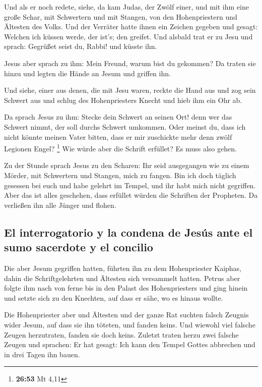  Und als er noch redete, siehe, da kam Judas, der Zwölf
einer, und mit ihm eine große Schar, mit Schwertern und mit Stangen, von
den Hohenpriestern und Ältesten des Volks.  Und der
Verräter hatte ihnen ein Zeichen gegeben und gesagt: Welchen ich küssen
werde, der ist's; den greifet.  Und alsbald trat er zu
Jesu und sprach: Gegrüßet seist du, Rabbi! und küsste ihn.

 Jesus aber sprach zu ihm: Mein Freund, warum bist du
gekommen? Da traten sie hinzu und legten die Hände an Jesum und griffen
ihn.

 Und siehe, einer aus denen, die mit Jesu waren, reckte
die Hand aus und zog sein Schwert aus und schlug des Hohenpriesters
Knecht und hieb ihm ein Ohr ab.

 Da sprach Jesus zu ihm: Stecke dein Schwert an seinen
Ort! denn wer das Schwert nimmt, der soll durchs Schwert umkommen.
 Oder meinst du, dass ich nicht könnte meinen Vater
bitten, dass er mir zuschickte mehr denn zwölf Legionen Engel?
\footnote{\textbf{26:53} Mt 4,11}  Wie würde aber die
Schrift erfüllet? Es muss also gehen.

 Zu der Stunde sprach Jesus zu den Scharen: Ihr seid
ausgegangen wie zu einem Mörder, mit Schwertern und Stangen, mich zu
fangen. Bin ich doch täglich gesessen bei euch und habe gelehrt im
Tempel, und ihr habt mich nicht gegriffen.  Aber das ist
alles geschehen, dass erfüllet würden die Schriften der Propheten. Da
verließen ihn alle Jünger und flohen.

\hypertarget{el-interrogatorio-y-la-condena-de-jesuxfas-ante-el-sumo-sacerdote-y-el-concilio}{%
\subsection{El interrogatorio y la condena de Jesús ante el sumo
sacerdote y el
concilio}\label{el-interrogatorio-y-la-condena-de-jesuxfas-ante-el-sumo-sacerdote-y-el-concilio}}

 Die aber Jesum gegriffen hatten, führten ihn zu dem
Hohenpriester Kaiphas, dahin die Schriftgelehrten und Ältesten sich
versammelt hatten.  Petrus aber folgte ihm nach von ferne
bis in den Palast des Hohenpriesters und ging hinein und setzte sich zu
den Knechten, auf dass er sähe, wo es hinaus wollte.

 Die Hohenpriester aber und Ältesten und der ganze Rat
suchten falsch Zeugnis wider Jesum, auf dass sie ihn töteten,
 und fanden keins. Und wiewohl viel falsche Zeugen
herzutraten, fanden sie doch keins. Zuletzt traten herzu zwei falsche
Zeugen  und sprachen: Er hat gesagt: Ich kann den Tempel
Gottes abbrechen und in drei Tagen ihn bauen.

